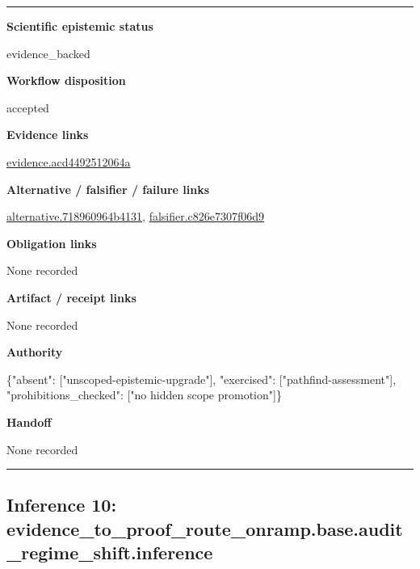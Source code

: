 \documentclass[10pt,a4paper]{article}
\newcommand{\TraceField}[2]{\par\noindent\textbf{#1}\par\noindent #2\par\smallskip}
\newenvironment{TraceDossier}{\par\medskip\noindent\hrule\medskip}{\medskip\hrule\par\medskip}
\begin{document}
\begin{TraceDossier}
\TraceField{Scientific epistemic status}{evidence\_\allowbreak{}backed}

\TraceField{Workflow disposition}{accepted}

\TraceField{Evidence links}{\hyperlink{trace-evidence-d4368b3271535b5671}{evidence.\allowbreak{}acd4492512\allowbreak{}064a}}

\TraceField{Alternative / falsifier / failure links}{\hyperlink{trace-alternative-bde35ecb1c6db2bf02}{alternativ\allowbreak{}e.\allowbreak{}718960964b\allowbreak{}4131}, \hyperlink{trace-alternative-3ed626adb1e56bc35c}{falsifier.\allowbreak{}c826e7307f\allowbreak{}06d9}}

\TraceField{Obligation links}{None recorded}

\TraceField{Artifact / receipt links}{None recorded}

\TraceField{Authority}{\{"absent":\allowbreak{} ["unscoped\allowbreak{}-\allowbreak{}epistemic-\allowbreak{}upgrade"],\allowbreak{} "exercised\allowbreak{}":\allowbreak{} ["pathfind\allowbreak{}-\allowbreak{}assessment\allowbreak{}"], "prohibiti\allowbreak{}ons\_\allowbreak{}checked":\allowbreak{} ["no hidden scope promotion"\allowbreak{}]\}}

\TraceField{Handoff}{None recorded}

\end{TraceDossier}
\pagebreak[2]\subsection{Inference 10: evidence\_\allowbreak{}to\_\allowbreak{}proof\_\allowbreak{}route\_\allowbreak{}onramp.\allowbreak{}base.\allowbreak{}audit\_\allowbreak{}regime\_\allowbreak{}shift.\allowbreak{}inference}\label{trace-inference-8fb2f397503ad0d5b6}
\end{document}

